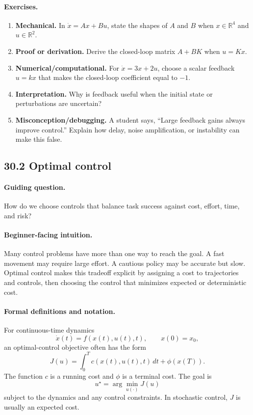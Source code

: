 \paragraph{Exercises.}
\begin{enumerate}[label=\textbf{30.1.\arabic*.}, leftmargin=*]
\item \textbf{Mechanical.} In \(\dot x=Ax+Bu\), state the shapes of \(A\) and \(B\) when \(x\in\mathbb R^4\) and \(u\in\mathbb R^2\).
\item \textbf{Proof or derivation.} Derive the closed-loop matrix \(A+BK\) when \(u=Kx\).
\item \textbf{Numerical/computational.} For \(\dot x=3x+2u\), choose a scalar feedback \(u=kx\) that makes the closed-loop coefficient equal to \(-1\).
\item \textbf{Interpretation.} Why is feedback useful when the initial state or perturbations are uncertain?
\item \textbf{Misconception/debugging.} A student says, ``Large feedback gains always improve control.'' Explain how delay, noise amplification, or instability can make this false.
\end{enumerate}

\subsection{30.2 Optimal control}

\paragraph{Guiding question.}
How do we choose controls that balance task success against cost, effort, time, and risk?

\paragraph{Beginner-facing intuition.}
Many control problems have more than one way to reach the goal. A fast movement may require large effort. A cautious policy may be accurate but slow. Optimal control makes this tradeoff explicit by assigning a cost to trajectories and controls, then choosing the control that minimizes expected or deterministic cost.

\paragraph{Formal definitions and notation.}
For continuous-time dynamics
\[
\dot x(t)=f(x(t),u(t),t),\qquad x(0)=x_0,
\]
an optimal-control objective often has the form
\[
\boxed{
J(u)=\int_0^T c(x(t),u(t),t)\,dt+\phi(x(T)).
}
\]
The function \(c\) is a running cost and \(\phi\) is a terminal cost. The goal is
\[
u^\star=\arg\min_{u(\cdot)}J(u)
\]
subject to the dynamics and any control constraints. In stochastic control, \(J\) is usually an expected cost.

